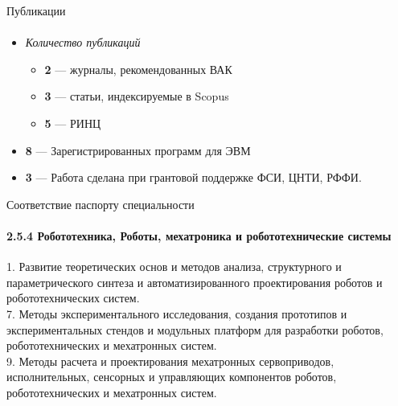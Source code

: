 \begin{frame}[t]{Публикации}
    \framesubtitle{}
    \begin{itemize}
        \item \textit{Количество публикаций}
              \begin{itemize}
                  \item \textbf{2} --- журналы, рекомендованных ВАК
                  \item \textbf{3} --- статьи, индексируемые в Scopus
                  \item \textbf{5} --- РИНЦ
              \end{itemize}
        \item \textbf{8} --- Зарегистрированных программ для ЭВМ
        \item \textbf{3} --- Работа сделана при грантовой поддержке ФСИ, ЦНТИ, РФФИ.
    \end{itemize}
\end{frame}


\begin{frame}[t]{Соответствие паспорту специальности}
    \framesubtitle{2.5.4 Робототехника, Роботы, мехатроника и
    робототехнические системы}
    1. Развитие теоретических основ и методов анализа, структурного и параметрического синтеза и автоматизированного проектирования роботов и робототехнических систем. \\
    7. Методы экспериментального исследования, создания прототипов и
    экспериментальных стендов и модульных платформ для разработки роботов, робототехнических и мехатронных систем. \\
    9. Методы расчета и проектирования мехатронных сервоприводов,
    исполнительных, сенсорных и управляющих компонентов роботов,
    робототехнических и мехатронных систем.
\end{frame}

